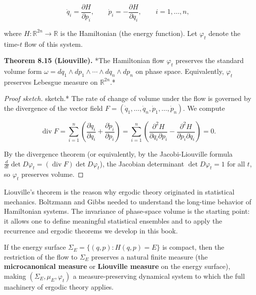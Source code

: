 \[
\dot{q}_i = \frac{\partial H}{\partial p_i}, \qquad \dot{p}_i = -\frac{\partial H}{\partial q_i}, \qquad i = 1, \ldots, n,
\]

where $H: \mathbb{R}^{2n} \to \mathbb{R}$ is the Hamiltonian (the energy function). Let $\varphi_t$ denote the time-$t$ flow of this system.

\textbf{Theorem 8.15 (Liouville).} *The Hamiltonian flow $\varphi_t$ preserves the standard volume form $\omega = dq_1 \wedge dp_1 \wedge \cdots \wedge dq_n \wedge dp_n$ on phase space. Equivalently, $\varphi_t$ preserves Lebesgue measure on $\mathbb{R}^{2n}$.*

\begin{proof}[Proof sketch]
sketch.* The rate of change of volume under the flow is governed by the divergence of the vector field $F = (\dot{q}_1, \ldots, \dot{q}_n, \dot{p}_1, \ldots, \dot{p}_n)$. We compute

\[
\operatorname{div} F = \sum_{i=1}^n \left(\frac{\partial \dot{q}_i}{\partial q_i} + \frac{\partial \dot{p}_i}{\partial p_i}\right) = \sum_{i=1}^n \left(\frac{\partial^2 H}{\partial q_i \partial p_i} - \frac{\partial^2 H}{\partial p_i \partial q_i}\right) = 0.
\]

By the divergence theorem (or equivalently, by the Jacobi-Liouville formula $\frac{d}{dt} \det D\varphi_t = (\operatorname{div} F) \det D\varphi_t$), the Jacobian determinant $\det D\varphi_t = 1$ for all $t$, so $\varphi_t$ preserves volume.
\end{proof}


\begin{remark}
Liouville's theorem is the reason why ergodic theory originated in statistical mechanics. Boltzmann and Gibbs needed to understand the long-time behavior of Hamiltonian systems. The invariance of phase-space volume is the starting point: it allows one to define meaningful statistical ensembles and to apply the recurrence and ergodic theorems we develop in this book.

If the energy surface $\Sigma_E = \{(q,p) : H(q,p) = E\}$ is compact, then the restriction of the flow to $\Sigma_E$ preserves a natural finite measure (the \textbf{microcanonical measure} or \textbf{Liouville measure} on the energy surface), making $(\Sigma_E, \mu_E, \varphi_t)$ a measure-preserving dynamical system to which the full machinery of ergodic theory applies.


\bigskip

\end{remark}


